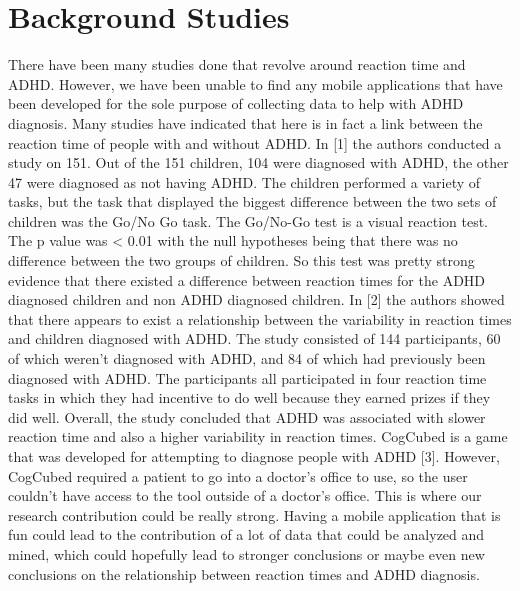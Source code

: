 \documentclass[a4wide]{article}
\begin{document}
\section{Background Studies}
\- There have been many studies done that revolve around reaction time and ADHD. However, we have been unable to find any mobile applications that have been developed for the sole purpose of collecting data to help with ADHD diagnosis. Many studies have indicated that here is in fact a link between the reaction time of people with and without ADHD.
\newline
\newline
\- In [1] the authors conducted a study on 151. Out of the 151 children, 104 were diagnosed with ADHD, the other 47 were diagnosed as not having ADHD. The children performed a variety of tasks, but the task that displayed the biggest difference between the two sets of children was the Go/No Go task. The Go/No-Go test is a visual reaction test. The p value was < 0.01 with the null hypotheses being that there was no difference between the two groups of children. So this test was pretty strong evidence that there existed a difference between reaction times for the ADHD diagnosed children and non ADHD diagnosed children.
\newline
\newline
\- In [2] the authors showed that there appears to exist a relationship between the variability in reaction times and children diagnosed with ADHD. The study consisted of 144 participants, 60 of which weren’t diagnosed with ADHD, and 84 of which had previously been diagnosed with ADHD. The participants all participated in four reaction time tasks in which they had incentive to do well because they earned prizes if they did well. Overall, the study concluded that ADHD was associated with slower reaction time and also a higher variability in reaction times.
\newline
\newline
\- CogCubed is a game that was developed for attempting to diagnose people with ADHD [3]. However, CogCubed required a patient to go into a doctor's office to use, so the user couldn't have access to the tool outside of a doctor's office. This is where our research contribution could be really strong. Having a mobile application that is fun could lead to the contribution of a lot of data that could be analyzed and mined, which could hopefully lead to stronger conclusions or maybe even new conclusions on the relationship between reaction times and ADHD diagnosis.
\end{document}
